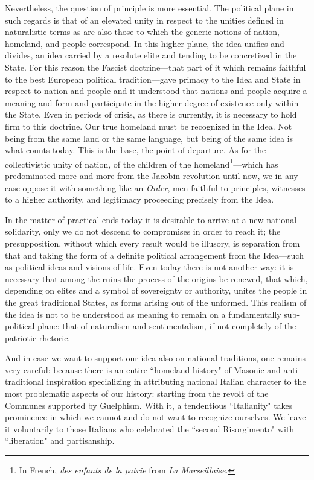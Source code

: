 Nevertheless, the question of principle is more essential. The political plane in such regards is that of an elevated unity in respect to the unities defined in naturalistic terms as are also those to which the generic notions of nation, homeland, and people correspond. In this higher plane, the idea unifies and divides, an idea carried by a resolute elite and tending to be concretized in the State. For this reason the Fascist doctrine—that part of it which remains faithful to the best European political tradition—gave primacy to the Idea and State in respect to nation and people and it understood that nations and people acquire a meaning and form and participate in the higher degree of existence only within the State. Even in periods of crisis, as there is currently, it is necessary to hold firm to this doctrine. Our true homeland must be recognized in the Idea. Not being from the same land or the same language, but being of the same idea is what counts today. This is the base, the point of departure. As for the collectivistic unity of nation, of the children of the homeland\footnote{In French, \emph{des enfants de la patrie} from \emph{La Marseillaise}.}—which has predominated more and more from the Jacobin revolution until now, we in any case oppose it with something like an \emph{Order}, men faithful to principles, witnesses to a higher authority, and legitimacy proceeding precisely from the Idea.

In the matter of practical ends today it is desirable to arrive at a new national solidarity, only we do not descend to compromises in order to reach it; the presupposition, without which every result would be illusory, is separation from that and taking the form of a definite political arrangement from the Idea—such as political ideas and visions of life. Even today there is not another way: it is necessary that among the ruins the process of the origins be renewed, that which, depending on elites and a symbol of sovereignty or authority, unites the people in the great traditional States, as forms arising out of the unformed. This realism of the idea is not to be understood as meaning to remain on a fundamentally sub-political plane: that of naturalism and sentimentalism, if not completely of the patriotic rhetoric.

And in case we want to support our idea also on national traditions, one remains very careful: because there is an entire ``homeland history" of Masonic and anti-traditional inspiration specializing in attributing national Italian character to the most problematic aspects of our history: starting from the revolt of the Communes supported by Guelphism. With it, a tendentious ``Italianity" takes prominence in which we cannot and do not want to recognize ourselves. We leave it voluntarily to those Italians who celebrated the ``second Risorgimento" with ``liberation" and partisanship.

